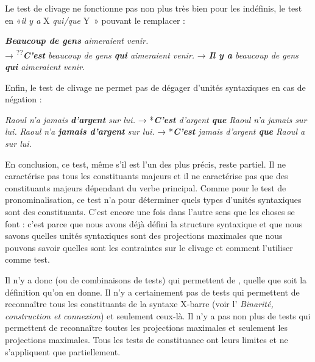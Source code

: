 {    Le test de clivage ne fonctionne pas non plus très bien pour les indéfinis, le test en «\textit{il y a} X \textit{qui/que} Y~» pouvant le remplacer :

    \ea
        \textit{\textbf{{Beaucoup de gens}}  {aimeraient venir.}}\\     
        \textrm{→}    \textsuperscript{??}\textit{\textbf{{C’est}}  {beaucoup de gens} \textbf{{qui}}  {aimeraient venir.}}
        \textrm{→}    \textit{\textbf{{Il y a}}  {beaucoup de gens} \textbf{{qui}}  {aimeraient venir.}}\\
    \z

    Enfin, le test de clivage ne permet pas de dégager d’unités syntaxiques en cas de négation :

    \ea
    \ea         \textit{{Raoul n’a}  {jamais} \textbf{{d’argent}} {sur lui.}} \textrm{→}  *\textit{\textbf{{C’est}} {d’argent} \textbf{{que}}  {Raoul n’a} {jamais sur lui.}}
    \ex         \textit{{Raoul n’a} \textbf{{jamais d’argent}}  {sur lui.}} \textrm{→}  *\textit{\textbf{{C’est}} {jamais d’argent} \textbf{{que}}  {Raoul a sur lui.}}
    \z
    \z

    En conclusion, ce test, même s’il est l’un des plus précis, reste partiel. Il ne caractérise pas tous les constituants majeurs et il ne caractérise pas que des constituants majeurs dépendant du verbe principal. Comme pour le test de pronominalisation, ce test n’a  pour déterminer quels types d’unités syntaxiques sont des constituants. C’est encore une fois dans l’autre sens que les choses se font : c’est parce que nous avons déjà défini la structure syntaxique et que nous savons quelles unités syntaxiques sont des projections maximales que nous pouvons savoir quelles sont les contraintes sur le clivage et comment l’utiliser comme test.

    Il n’y a donc  (ou de combinaisons de tests) qui permettent de , quelle que soit la définition qu’on en donne. Il n’y a certainement pas de tests qui permettent de reconnaître tous les constituants de la syntaxe X-barre (voir l' \textit{Binarité, construction et connexion}) et seulement ceux-là. Il n’y a pas non plus de tests qui permettent de reconnaître toutes les projections maximales et seulement les projections maximales. Tous les tests de constituance ont leurs limites et ne s’appliquent que partiellement.

}
